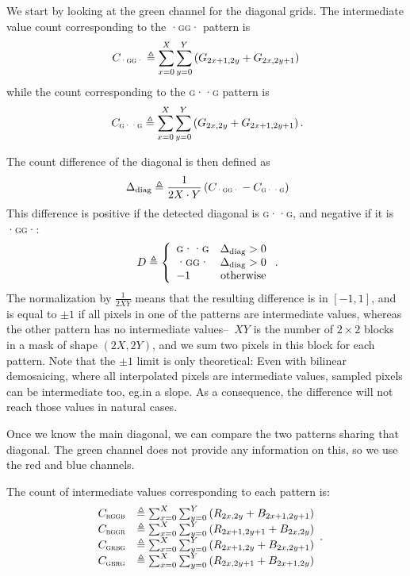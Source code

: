 \documentclass{ipol}
\begin{document}
We start by looking at the green channel for the diagonal grids. The intermediate value count corresponding to the \textsc{·gg·} pattern is
\[C_{\textsc{·gg·}} \triangleq \sum_{x=0}^X\sum_{y=0}^Y\left(G_{2x+1, 2y} + G_{2x, 2y+1}\right)\]
while the count corresponding to the \textsc{g··g} pattern is
\[\phantom.C_{\textsc{g··g}} \triangleq \sum_{x=0}^X\sum_{y=0}^Y\left(G_{2x, 2y} + G_{2x+1, 2y+1}\right).\]

The count difference of the diagonal is then defined as
\[\phantom.\Delta_{\mathrm{diag}}  \triangleq \frac 1 {2X\cdot Y} \left(C_{\textsc{·gg·}} - C_{\textsc{g··g}}\right)\]
This difference is positive if the detected diagonal is \textsc{g··g}, and negative if it is \textsc{·gg·}:
\[\phantom.D\triangleq\left\{\begin{array}{lc}\textsc{g··g}&\Delta_{\mathrm{diag}}>0\\\textsc{·gg·}&\Delta_{\mathrm{diag}}>0\\-1&\text{otherwise}\end{array}\right..\]
        The normalization by $\frac{1}{2XY}$ means that the resulting difference is in $[-1, 1]$, and is equal to $\pm1$ if all pixels in one of the patterns are intermediate values, whereas the other pattern has no intermediate values--~$XY$ is the number of $2\times2$ blocks in a mask of shape $(2X, 2Y)$, and we sum two pixels in this block for each pattern. Note that the $\pm1$ limit is only theoretical: Even with bilinear demosaicing, where all interpolated pixels are intermediate values, sampled pixels can be intermediate too, eg.\@ in a slope. As a consequence, the difference will not reach those values in natural cases.

Once we know the main diagonal, we can compare the two patterns sharing that diagonal. The green channel does not provide any information on this, so we use the red and blue channels.

The count of intermediate values corresponding to each pattern is:
\[\phantom.\begin{array}{ll}
        C_{\textsc{rggb}} &\triangleq \sum_{x=0}^X\sum_{y=0}^Y\left(R_{2x, 2y} + B_{2x+1, 2y+1}\right)\\
        C_{\textsc{bggr}} &\triangleq \sum_{x=0}^X\sum_{y=0}^Y\left(R_{2x+1, 2y+1} + B_{2x, 2y}\right)\\
        C_{\textsc{grbg}} &\triangleq \sum_{x=0}^X\sum_{y=0}^Y\left(R_{2x+1, 2y} + B_{2x, 2y+1}\right)\\
        C_{\textsc{gbrg}} &\triangleq \sum_{x=0}^X\sum_{y=0}^Y\left(R_{2x, 2y+1} + B_{2x+1, 2y}\right)
\end{array}.\]
\end{document}
